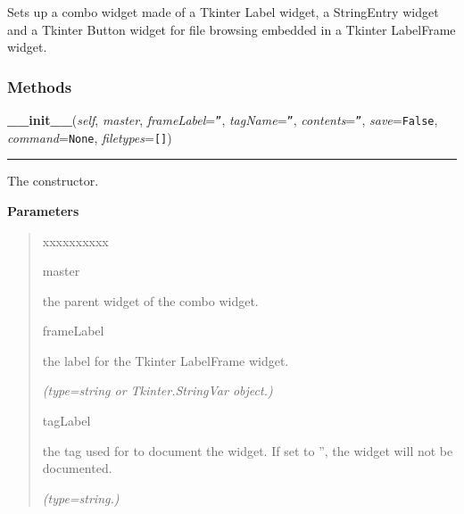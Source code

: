 Sets up a combo widget made of a Tkinter Label widget, a StringEntry widget
and a Tkinter Button widget for file browsing embedded in a Tkinter 
LabelFrame widget.



  \subsubsection{Methods}

    \vspace{0.5ex}

\hspace{.8\funcindent}\begin{boxedminipage}{\funcwidth}

    \raggedright \textbf{\_\_init\_\_}(\textit{self}, \textit{master}, \textit{frameLabel}={\tt ''}, \textit{tagName}={\tt ''}, \textit{contents}={\tt ''}, \textit{save}={\tt False}, \textit{command}={\tt None}, \textit{filetypes}={\tt []})

    \vspace{-1.5ex}

    \rule{\textwidth}{0.5\fboxrule}
\setlength{\parskip}{2ex}
    The constructor.

\setlength{\parskip}{1ex}
      \textbf{Parameters}
      \vspace{-1ex}

      \begin{quote}
        \begin{Ventry}{xxxxxxxxxx}

          \item[master]

          the parent widget of the combo widget.

          \item[frameLabel]

          the label for the Tkinter LabelFrame widget.

            {\it (type=string or Tkinter.StringVar object.)}

          \item[tagLabel]

          the tag used for to document the widget. If set to '', the widget
          will not be documented.

            {\it (type=string.)}


\end{Ventry}
\end{quote}
\end{boxedminipage}
